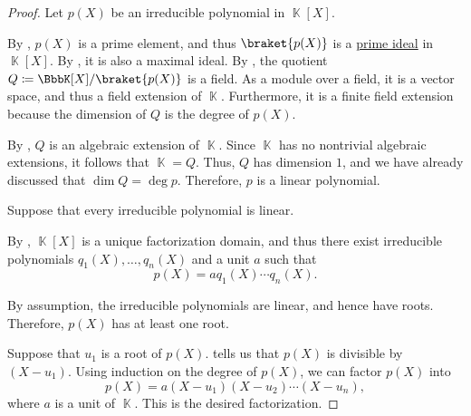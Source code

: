 \begin{proof}
   Let \( p(X) \) be an irreducible polynomial in \( \BbbK[X] \).

  By , \( p(X) \) is a prime element, and thus \( \braket {p(X)} \) is a \hyperref[def:prime_ideal]{prime ideal} in \( \BbbK[X] \). By , it is also a maximal ideal. By , the quotient \( Q \coloneqq \BbbK[X] / \braket{ p(X) } \) is a field. As a module over a field, it is a vector space, and thus a field extension of \( \BbbK \). Furthermore, it is a finite field extension because the dimension of \( Q \) is the degree of \( p(X) \).

  By , \( Q \) is an algebraic extension of \( \BbbK \). Since \( \BbbK \) has no nontrivial algebraic extensions, it follows that \( \BbbK = Q \). Thus, \( Q \) has dimension \( 1 \), and we have already discussed that \( \dim Q = \deg p \). Therefore, \( p \) is a linear polynomial.

   Suppose that every irreducible polynomial is linear.

  By , \( \BbbK[X] \) is a unique factorization domain, and thus there exist irreducible polynomials \( q_1(X), \ldots, q_n(X) \) and a unit \( a \) such that
  \begin{equation*}
    p(X) = a q_1(X) \cdots q_n(X).
  \end{equation*}

  By assumption, the irreducible polynomials are linear, and hence have roots. Therefore, \( p(X) \) has at least one root.

   Suppose that \( u_1 \) is a root of \( p(X) \).  tells us that \( p(X) \) is divisible by \( (X - u_1) \). Using induction on the degree of \( p(X) \), we can factor \( p(X) \) into
  \begin{equation*}
    p(X) = a (X - u_1) (X - u_2) \cdots (X - u_n),
  \end{equation*}
  where \( a \) is a unit of \( \BbbK \). This is the desired factorization.


\end{proof}
